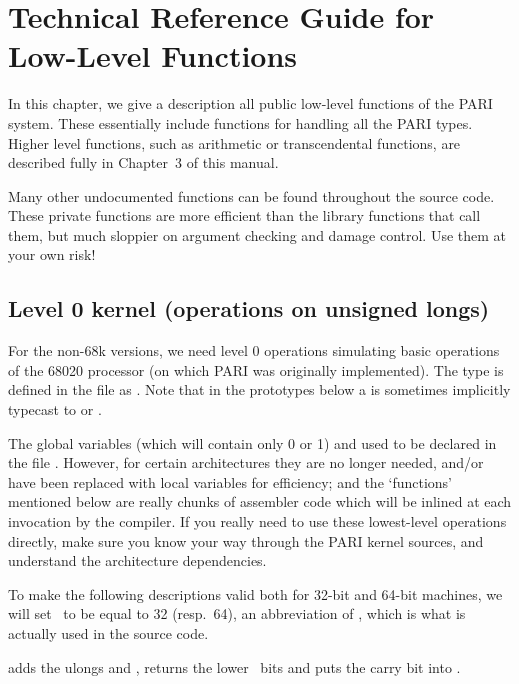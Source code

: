 \chapter{Technical Reference Guide for Low-Level Functions}
\def\B{\kbd{BIL}}
\def\op{{\it op\/}}

In this chapter, we give a description all public low-level functions of the
PARI system. These essentially include functions for handling all the PARI
types. Higher level functions, such as arithmetic or transcendental
functions, are described fully in Chapter~3 of this manual.

Many other undocumented functions can be found throughout the source code.
These private functions are more efficient than the library functions that
call them, but much sloppier on argument checking and damage control. Use
them at your own risk!

\section{Level 0 kernel (operations on unsigned longs)}

\noindent
For the non-68k versions, we need level 0 operations simulating basic
operations of the 68020 processor (on which PARI was originally
implemented). The type  is defined in the file  as
. Note that in the prototypes below a  is
sometimes implicitly typecast to  or .

The global  variables  (which will contain
only 0 or 1) and  used to be declared in the file
. However, for certain architectures they are no longer
needed, and/or have been replaced with local variables for efficiency;
and the `functions' mentioned below are really chunks of assembler code which
will be inlined at each invocation by the compiler. If you really need to
use these lowest-level operations directly, make sure you know your way
through the PARI kernel sources, and understand the architecture dependencies.

To make the following descriptions valid both for 32-bit and 64-bit
machines, we will set \B\ to be equal to 32 (resp.~64), an abbreviation of
, which is what is actually used in the source code.

 adds the ulongs  and ,
returns the lower \B\ bits and puts the carry bit into .

